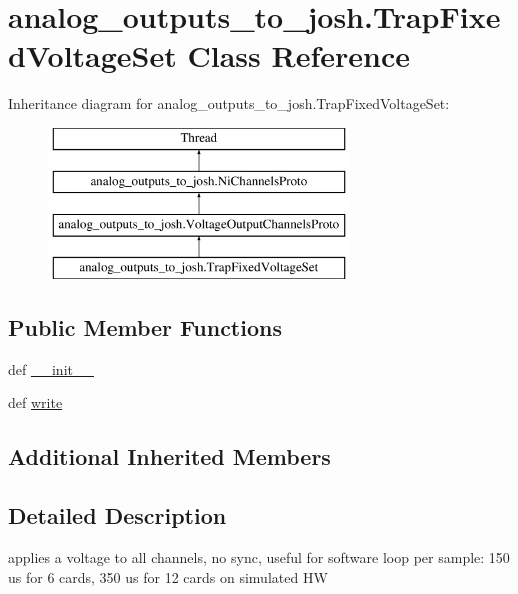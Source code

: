 \hypertarget{classanalog__outputs__to__josh_1_1_trap_fixed_voltage_set}{\section{analog\-\_\-outputs\-\_\-to\-\_\-josh.\-Trap\-Fixed\-Voltage\-Set Class Reference}
\label{classanalog__outputs__to__josh_1_1_trap_fixed_voltage_set}
}
Inheritance diagram for analog\-\_\-outputs\-\_\-to\-\_\-josh.\-Trap\-Fixed\-Voltage\-Set\-:\begin{figure}[H]
\begin{center}
\leavevmode
\includegraphics[height=4.000000cm]{classanalog__outputs__to__josh_1_1_trap_fixed_voltage_set}
\end{center}
\end{figure}
\subsection*{Public Member Functions}
\begin{DoxyCompactItemize}
\item 
def \hyperlink{classanalog__outputs__to__josh_1_1_trap_fixed_voltage_set_ad01c4cd59b25f0ba46960213e64f6e3f}{\-\_\-\-\_\-init\-\_\-\-\_\-}
\item 
def \hyperlink{classanalog__outputs__to__josh_1_1_trap_fixed_voltage_set_a6c2c8c878d5bf156c079e7f28b909e66}{write}
\end{DoxyCompactItemize}
\subsection*{Additional Inherited Members}


\subsection{Detailed Description}
\begin{DoxyVerb}applies a voltage to all channels, no sync, useful for software loop
per sample: 150 us for 6 cards, 350 us for 12 cards  on simulated HW
\end{DoxyVerb}
 

